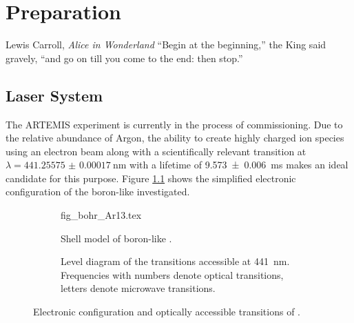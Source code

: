 \chapter{Preparation}%
\label{sec:preparation}
\begin{chapquote}{Lewis Carroll, \textit{Alice in Wonderland}}
``Begin at the beginning,'' the King said gravely, ``and go on till you come to the end: then stop.''
\end{chapquote}

\section{Laser System}%
\label{sec:prep_laser_system}
The ARTEMIS experiment is currently in the process of commissioning. Due to the relative abundance of Argon, the ability to create highly charged ion species using an electron beam along with a scientifically relevant transition at $\lambda = \qty{441.25575(17)}{\nm}$ \cite{ar13+_wavelength} with a lifetime of \qty{9.573(6)}{\ms} \cite{ar13+_lifetime} makes  an ideal candidate for this purpose. Figure \ref{fig:bohr_ar13} shows the simplified electronic configuration of the boron-like  investigated.
\begin{figure}[ht]
    \centering
    \begin{subfigure}{0.28\linewidth}
        \centering
        {fig_bohr_Ar13.tex}
        \caption{Shell model of boron-like .}
        \label{fig:bohr_ar13}
    \end{subfigure}
    \begin{subfigure}{0.6\linewidth}
        \centering
        \caption{Level diagram of the  transitions accessible at \qty{441}{\nm}. Frequencies with numbers denote optical transitions, letters denote microwave transitions.}
        \label{fig:level_transitions}
    \end{subfigure}
    \caption{Electronic configuration and optically accessible transitions of .}
    \label{fig:ar13}
\end{figure}

